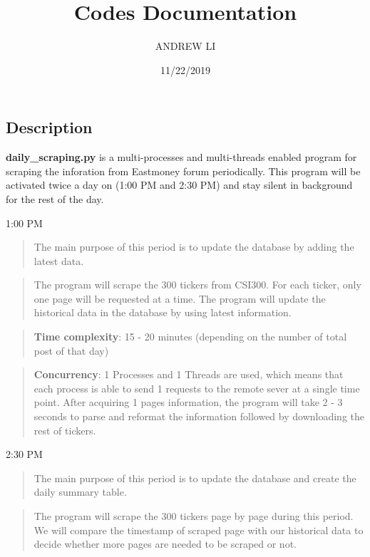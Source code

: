 \documentclass[]{article}
\title{Codes Documentation}
\author{ANDREW LI}
\date{11/22/2019}
\begin{document}
\maketitle

\hypertarget{description}{%
\subsection{Description}\label{description}}

\textbf{daily\_scraping.py} is a multi-processes and multi-threads
enabled program for scraping the inforation from Eastmoney forum
periodically. This program will be activated twice a day on (1:00 PM and
2:30 PM) and stay silent in background for the rest of the day.

1:00 PM

\begin{quote}
The main purpose of this period is to update the database by adding the
latest data.
\end{quote}

\begin{quote}
The program will scrape the 300 tickers from CSI300. For each ticker,
only one page will be requested at a time. The program will update the
historical data in the database by using latest information.
\end{quote}

\begin{quote}
\textbf{Time complexity}: 15 - 20 minutes (depending on the number of
total post of that day)
\end{quote}

\begin{quote}
\textbf{Concurrency}: 1 Processes and 1 Threads are used, which means
that each process is able to send 1 requests to the remote sever at a
single time point. After acquiring 1 pages information, the program will
take 2 - 3 seconds to parse and reformat the information followed by
downloading the rest of tickers.
\end{quote}

2:30 PM

\begin{quote}
The main purpose of this period is to update the database and create the
daily summary table.
\end{quote}

\begin{quote}
The program will scrape the 300 tickers page by page during this period.
We will compare the timestamp of scraped page with our historical data
to decide whether more pages are needed to be scraped or not.
\end{quote}
\end{document}
